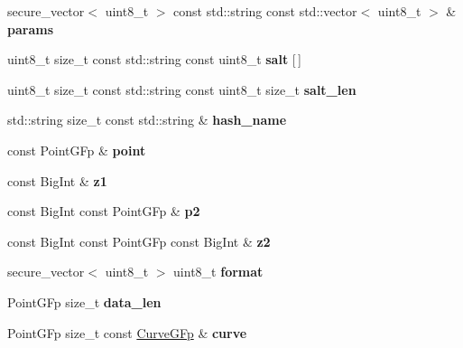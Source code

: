 \begin{DoxyCompactItemize}
secure\+\_\+vector$<$ uint8\+\_\+t $>$ const std\+::string const std\+::vector$<$ uint8\+\_\+t $>$ \& {\bfseries params}
\item 
\mbox{\label{namespace_botan_a699a5fee3ed89a41ec618dadf683c9a9}} 
uint8\+\_\+t size\+\_\+t const std\+::string const uint8\+\_\+t {\bfseries salt} \mbox{[}$\,$\mbox{]}
\item 
\mbox{\label{namespace_botan_a0794c61071abe0f9c09ee9052a0c174d}} 
uint8\+\_\+t size\+\_\+t const std\+::string const uint8\+\_\+t size\+\_\+t {\bfseries salt\+\_\+len}
\item 
\mbox{\label{namespace_botan_a46f00cf06873669222ace771b96c877a}} 
std\+::string size\+\_\+t const std\+::string \& {\bfseries hash\+\_\+name}
\item 
\mbox{\label{namespace_botan_acbfaa3650fc30f1a2d6ea0fd35dd5513}} 
const Point\+G\+Fp \& {\bfseries point}
\item 
\mbox{\label{namespace_botan_a4e7f719f1e808cf4551ec2ff4d0364be}} 
const Big\+Int \& {\bfseries z1}
\item 
\mbox{\label{namespace_botan_ab702147f5064439198b8ec561b6ad023}} 
const Big\+Int const Point\+G\+Fp \& {\bfseries p2}
\item 
\mbox{\label{namespace_botan_ac70a94be478803d91ba2b30cdb61af50}} 
const Big\+Int const Point\+G\+Fp const Big\+Int \& {\bfseries z2}
\item 
secure\+\_\+vector$<$ uint8\+\_\+t $>$ uint8\+\_\+t {\bfseries format}
\item 
\mbox{\label{namespace_botan_a164c7ea110b841c1c3e1c800ec831017}} 
Point\+G\+Fp size\+\_\+t {\bfseries data\+\_\+len}
\item 
\mbox{\label{namespace_botan_aa96385f036be453bd61fa4311fc47c87}} 
Point\+G\+Fp size\+\_\+t const \hyperlink{class_botan_1_1_curve_g_fp}{Curve\+G\+Fp} \& {\bfseries curve}
\item 
\mbox{\label{namespace_botan_ae7d20a4d824012228b47dcd42c14268a}} 

\end{DoxyCompactItemize}
